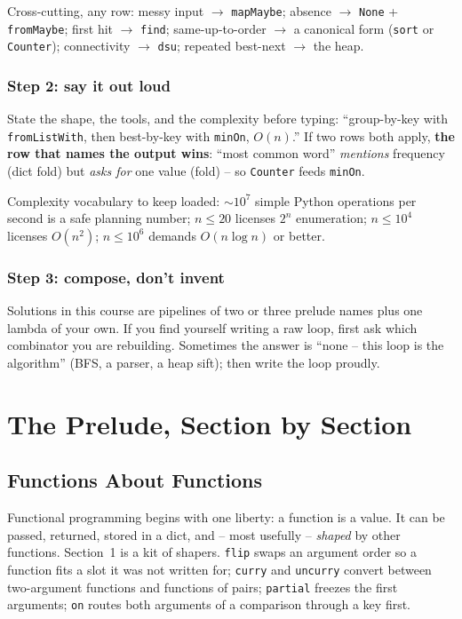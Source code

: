 \documentclass[11pt,letterpaper]{book}
\begin{document}
Cross-cutting, any row: messy input $\rightarrow$ \texttt{mapMaybe}; absence
$\rightarrow$ \texttt{None} + \texttt{fromMaybe}; first hit $\rightarrow$
\texttt{find}; same-up-to-order $\rightarrow$ a canonical form (\texttt{sort}
or \texttt{Counter}); connectivity $\rightarrow$ \texttt{dsu}; repeated
best-next $\rightarrow$ the heap.

\section{Step 2: say it out loud}
State the shape, the tools, and the complexity before typing: ``group-by-key
with \texttt{fromListWith}, then best-by-key with \texttt{minOn},
$O(n)$.'' If two rows both apply, \textbf{the row that names the output wins}:
``most common word'' \emph{mentions} frequency (dict fold) but \emph{asks for}
one value (fold) -- so \texttt{Counter} feeds \texttt{minOn}.

Complexity vocabulary to keep loaded: $\sim$$10^7$ simple Python operations
per second is a safe planning number; $n \le 20$ licenses $2^n$ enumeration;
$n \le 10^4$ licenses $O(n^2)$; $n \le 10^6$ demands $O(n \log n)$ or better.

\section{Step 3: compose, don't invent}
Solutions in this course are pipelines of two or three prelude names plus one
lambda of your own. If you find yourself writing a raw loop, first ask which
combinator you are rebuilding. Sometimes the answer is ``none -- this loop is
the algorithm'' (BFS, a parser, a heap sift); then write the loop proudly.
\part{The Prelude, Section by Section}
\chapter{Functions About Functions}

Functional programming begins with one liberty: a function is a value. It can
be passed, returned, stored in a dict, and -- most usefully -- \emph{shaped} by
other functions. Section~1 is a kit of shapers. \texttt{flip} swaps an argument
order so a function fits a slot it was not written for; \texttt{curry} and
\texttt{uncurry} convert between two-argument functions and functions of pairs;
\texttt{partial} freezes the first arguments; \texttt{on} routes both arguments
of a comparison through a key first.
\end{document}
